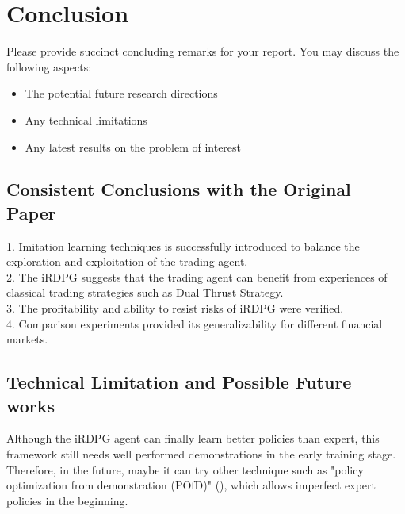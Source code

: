 \section{Conclusion}
\label{section:conclusion}
Please provide succinct concluding remarks for your report. You may discuss the following aspects:
\begin{itemize}
    \item The potential future research directions
    \item Any technical limitations
    \item Any latest results on the problem of interest
\end{itemize}

\subsection{Consistent Conclusions with the Original Paper}
1. Imitation learning techniques is successfully introduced to balance the exploration and exploitation of the trading agent.\\
2. The iRDPG suggests that the trading agent can benefit from experiences of classical trading strategies such as Dual Thrust Strategy.\\
3. The profitability and ability to resist risks of iRDPG were verified.\\
4. Comparison experiments provided its generalizability for different financial markets.\\


\subsection{Technical Limitation and Possible Future works}
Although the iRDPG agent can finally learn better policies than expert, this framework still needs well performed demonstrations in the early training stage. Therefore, in the future, maybe it can try other technique such as "policy optimization from demonstration (POfD)" (\cite{kang2018policy}), which allows imperfect expert policies in the beginning.


